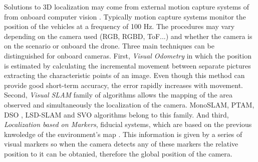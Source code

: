 \documentclass{styles/svproc}
\begin{document}
	Solutions to 3D localization may come from external motion capture systems \cite{jimenez2014,lupashin2014} of from onboard computer vision \cite{wu2013}. Typically motion capture systems monitor the position of the vehicles at a frequency of 100 Hz. The procedures may vary depending on the camera used (RGB, RGBD, ToF...) and whether the camera is on the scenario or onboard the drone. Three main techniques can be distinguished for onboard cameras. First, \textit{Visual Odometry} in which the position is estimated by calculating the incremental movement between separate pictures extracting the characteristic points of an image. Even though this method can provide good short-term accuracy, the error rapidly increases with movement. Second, \textit{Visual SLAM} family of algorithms allows the mapping of the area observed and simultaneously the localization of the camera. MonoSLAM, PTAM, DSO \cite{engel2017}, LSD-SLAM and SVO \cite{forster2014} algorithms belong to this family. And third, \textit{Localization based on Markers}, fiducial systems, which are based on the previous knwoledge of the environment's map \cite{apvrille2013,lopezceron2016}. This information is given by a series of visual markers so when the camera detects any of these markers the relative position to it can be obtanied, therefore the global position of the camera. 
	


	
\end{document}
